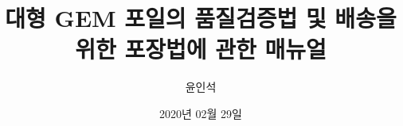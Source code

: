 \documentclass[11pt]{article}
\title{대형 GEM 포일의 품질검증법 및 배송을 위한 포장법에 관한 매뉴얼}
\author{윤인석}
\date{2020년 02월 29일}
\begin{document}
\maketitle

\begin{abstract}
  
\end{abstract}

\clearpage

\tableofcontents
\listoffigures
\listoftables

\clearpage







\appendix


%
\end{document}
